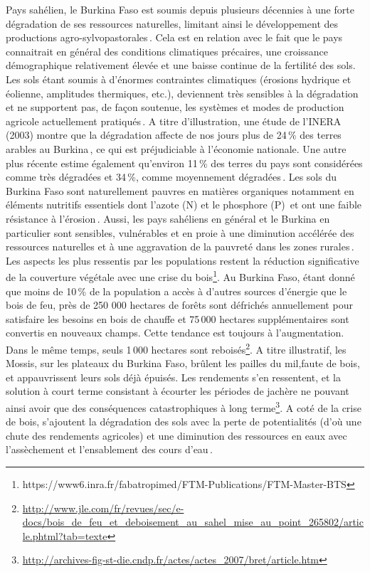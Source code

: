 \documentclass[a4paper,11pt]{article}
\begin{document}
Pays sahélien, le Burkina Faso est soumis depuis plusieurs décennies à
une forte dégradation de ses ressources naturelles, limitant ainsi le
développement des productions
agro-sylvopastorales\,\cite{Thiombiano_2000}. Cela est en relation
avec le fait que le pays connaitrait en général des conditions
climatiques précaires, une croissance démographique relativement
élevée et une baisse continue de la fertilité des sols. Les sols étant
soumis à d’énormes contraintes climatiques (érosions hydrique et
éolienne, amplitudes thermiques, etc.), deviennent très sensibles à la
dégradation et ne supportent pas, de façon soutenue, les systèmes et
modes de production agricole actuellement
pratiqués\,\cite{PANA_2003}. A titre d’illustration, une étude de
l’INERA (2003) montre que la dégradation affecte de nos jours plus de
24\,\% des terres arables au Burkina\,\cite{INERA_2003}, ce qui est
préjudiciable à l’économie nationale. Une autre plus récente estime
également qu’environ 11\,\% des terres du pays sont considérées comme
très dégradées et 34\,\%, comme moyennement dégradées\,\cite{SPCONEDD_2006}.
Les sols du Burkina Faso sont naturellement pauvres en
matières organiques notamment en éléments nutritifs essentiels dont
l’azote (N) et le phosphore (P)\,\cite{Traore_2008} et ont
une faible résistance à l’érosion\,\cite{Berger_1991}. Aussi, les
pays sahéliens en général et le Burkina en particulier sont sensibles,
vulnérables et en proie à une diminution accélérée des ressources
naturelles et à une aggravation de la pauvreté dans les zones
rurales\,\cite{Roose_2004}. Les aspects les plus ressentis par les
populations restent la réduction significative de la couverture
végétale avec une crise du
bois\footnote{https://www6.inra.fr/fabatropimed/FTM-Publications/FTM-Master-BTS}.
Au Burkina Faso, étant donné que moins de 10\,\% de la population a
accès à d’autres sources d’énergie que le bois de feu, près de 250 000
hectares de forêts sont défrichés annuellement pour satisfaire les
besoins en bois de chauffe et 75\,000 hectares supplémentaires sont
convertis en nouveaux champs. Cette tendance est toujours à
l’augmentation. Dans le même temps, seuls 1\,000 hectares sont
reboisés\footnote{\url{http://www.jle.com/fr/revues/sec/e-docs/bois_de_feu_et_deboisement_au_sahel_mise_au_point_265802/article.phtml?tab=texte}}. A
titre illustratif, les Mossis, sur les plateaux du Burkina Faso,
brûlent les pailles du mil,faute de bois, et appauvrissent leurs sols
déjà épuisés. Les rendements s’en ressentent, et la solution à court
terme consistant à écourter les périodes de jachère ne pouvant ainsi
avoir que des conséquences catastrophiques à long
terme\footnote{\url{http://archives-fig-st-die.cndp.fr/actes/actes_2007/bret/article.htm}}.
A coté de la crise de bois, s’ajoutent la dégradation des sols avec la
perte de potentialités (d’où une chute des rendements agricoles) et
une diminution des ressources en eaux avec l’assèchement et
l’ensablement des cours d’eau\,\cite{ZOMBRE_2006}.
\end{document}
